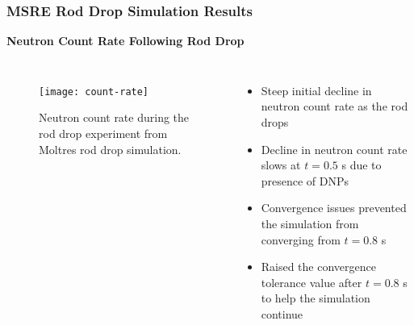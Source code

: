 \begin{frame}
  \frametitle{MSRE Rod Drop Simulation Results}
  \textbf{Neutron Count Rate Following Rod Drop}
  \begin{columns}
    \column{5.5cm}
    \begin{figure}[t]
      \centering
      \texttt{[image: count-rate]}
      \caption{Neutron count rate during the rod drop experiment from Moltres rod drop simulation.}
      \label{fig:count-rate}
    \end{figure}
    \column{5.5cm}
    \begin{itemize}
      \item Steep initial decline in neutron count rate as the rod drops
      \item Decline in neutron count rate slows at $t=0.5$ s due to presence of DNPs
      \item Convergence issues prevented the simulation from converging from $t = 0.8$ s
      \item Raised the convergence tolerance value after $t=0.8$ s to help the simulation continue
    \end{itemize}
  \end{columns}
\end{frame}

